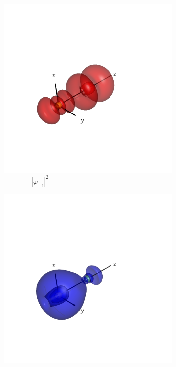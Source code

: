 \documentclass[journal=inoraj,manuscript=article]{achemso}
\begin{document}
\begin{figure}[!h]
    \vspace{0.0cm}
    \begin{subfigure}[t]{0.32\textwidth}
        \centering
        \includegraphics[width=\linewidth]{./AuRn+/nocv-1.png} 
        \caption*{\ \ \ \ \ \ \ \ $|\varphi_{-1}|^2$} 
    \end{subfigure}
    \hfill
    \begin{subfigure}[t]{0.32\textwidth}
        \centering
        \includegraphics[width=\linewidth]{./AuRn+/nocv+1.png} 

\end{subfigure}
\end{figure}
\end{document}

